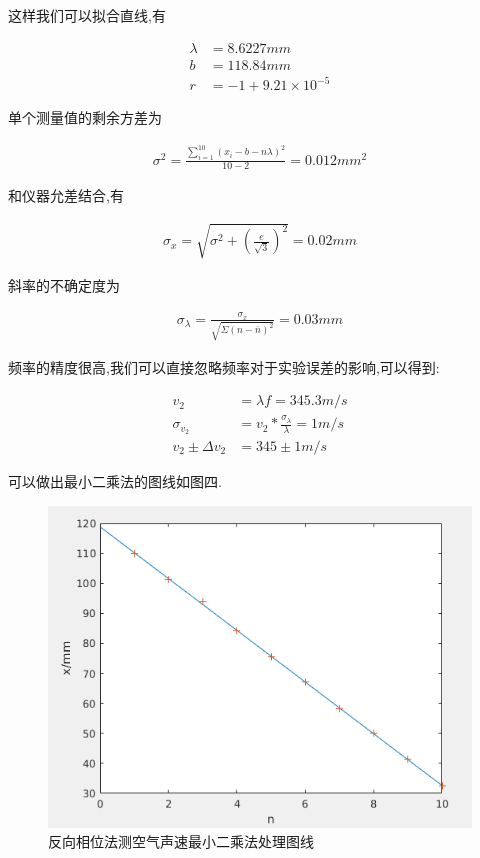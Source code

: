 \documentclass[a4paper,10pt,notitlepage]{article}
\begin{document}
	这样我们可以拟合直线,有
	
\begin{align}
	\lambda &= 8.6227mm \\
	b &= 118.84 mm \\
	r &= -1 + 9.21\times10^{-5}
\end{align}

	单个测量值的剩余方差为
	
\begin{align}
	\sigma ^ 2 = \frac{\sum_{i = 1}^{10}(x_i - b - n\lambda )^2}{10 - 2} = 0.012 mm^2 
\end{align}

	和仪器允差结合,有
	
\begin{align}
	\sigma_x = \sqrt{\sigma^2 + (\frac{e}{\sqrt{3}})^2} = 0.02 mm 
\end{align}

	斜率的不确定度为
	
\begin{align}
	\sigma_{\lambda} = \frac{\sigma_x}{\sqrt{\Sigma(n - \bar{n})^2}} = 0.03mm
\end{align}

	频率的精度很高,我们可以直接忽略频率对于实验误差的影响,可以得到:
	
\begin{align}
	v_2 &= \lambda f = 345.3 m/s \\
	\sigma_{v_2} &= v_2 * \frac{\sigma_{\lambda}}{\lambda} = 1m/s \\
	v_2 \pm \Delta v_2 &= 345 \pm 1m/s
\end{align}

	可以做出最小二乘法的图线如图四.
	
\begin{figure}[h]
	\includegraphics[scale=0.6]{f4.png}
	\caption{反向相位法测空气声速最小二乘法处理图线}
\end{figure}
\end{document}
